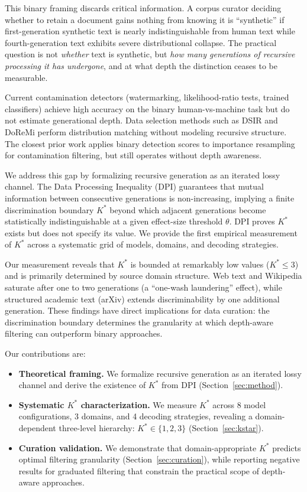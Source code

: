 \documentclass[11pt,a4paper]{article}
\begin{document}
This binary framing discards critical information. A corpus curator deciding whether to retain a document gains nothing from knowing it is ``synthetic'' if first-generation synthetic text is nearly indistinguishable from human text while fourth-generation text exhibits severe distributional collapse. The practical question is not \emph{whether} text is synthetic, but \emph{how many generations of recursive processing it has undergone}, and at what depth the distinction ceases to be measurable.

Current contamination detectors (watermarking, likelihood-ratio tests, trained classifiers) achieve high accuracy on the binary human-vs-machine task but do not estimate generational depth. Data selection methods such as DSIR and DoReMi perform distribution matching without modeling recursive structure. The closest prior work applies binary detection scores to importance resampling for contamination filtering, but still operates without depth awareness.

We address this gap by formalizing recursive generation as an iterated lossy channel. The Data Processing Inequality (DPI) guarantees that mutual information between consecutive generations is non-increasing, implying a finite discrimination boundary $K^*$ beyond which adjacent generations become statistically indistinguishable at a given effect-size threshold $\theta$. DPI proves $K^*$ exists but does not specify its value. We provide the first empirical measurement of $K^*$ across a systematic grid of models, domains, and decoding strategies.

Our measurement reveals that $K^*$ is bounded at remarkably low values ($K^* \leq 3$) and is primarily determined by source domain structure. Web text and Wikipedia saturate after one to two generations (a ``one-wash laundering'' effect), while structured academic text (arXiv) extends discriminability by one additional generation. These findings have direct implications for data curation: the discrimination boundary determines the granularity at which depth-aware filtering can outperform binary approaches.

Our contributions are:
\begin{itemize}
    \item \textbf{Theoretical framing.} We formalize recursive generation as an iterated lossy channel and derive the existence of $K^*$ from DPI (Section~\ref{sec:method}).
    \item \textbf{Systematic $K^*$ characterization.} We measure $K^*$ across 8 model configurations, 3 domains, and 4 decoding strategies, revealing a domain-dependent three-level hierarchy: $K^* \in \{1, 2, 3\}$ (Section~\ref{sec:kstar}).
    \item \textbf{Curation validation.} We demonstrate that domain-appropriate $K^*$ predicts optimal filtering granularity (Section~\ref{sec:curation}), while reporting negative results for graduated filtering that constrain the practical scope of depth-aware approaches.
\end{itemize}
\end{document}
